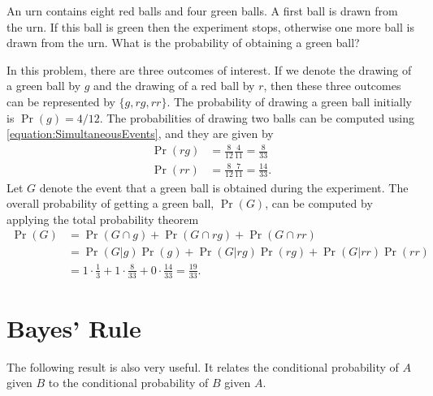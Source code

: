 \begin{example}
An urn contains eight red balls and four green balls.
A first ball is drawn from the urn.
If this ball is green then the experiment stops, otherwise one more ball is drawn from the urn.
What is the probability of obtaining a green ball?

In this problem, there are three outcomes of interest.
If we denote the drawing of a green ball by $g$ and the drawing of a red ball by $r$, then these three outcomes can be represented by $\{ g, rg, rr \}$.
The probability of drawing a green ball initially is $\Pr (g) = 4/12$.
The probabilities of drawing two balls can be computed using \eqref{equation:SimultaneousEvents}, and they are given by
\begin{align*}
\Pr (rg) &= \frac{8}{12} \frac{4}{11} = \frac{8}{33} \\
\Pr (rr) &= \frac{8}{12} \frac{7}{11} = \frac{14}{33} .
\end{align*}
Let $G$ denote the event that a green ball is obtained during the experiment.
The overall probability of getting a green ball, $\Pr (G)$, can be computed by applying the total probability theorem
\begin{equation*}
\begin{split}
\Pr (G) &= \Pr (G \cap g) + \Pr (G \cap rg) + \Pr (G \cap rr) \\
&= \Pr (G|g) \Pr(g) + \Pr (G|rg) \Pr(rg) + \Pr (G|rr) \Pr(rr) \\
&= 1 \cdot \frac{1}{3} + 1 \cdot \frac{8}{33} + 0 \cdot \frac{14}{33}
= \frac{19}{33} .
\end{split}
\end{equation*}
\end{example}


\section{Bayes' Rule}

The following result is also very useful.
It relates the conditional probability of $A$ given $B$ to the conditional probability of $B$ given $A$.

